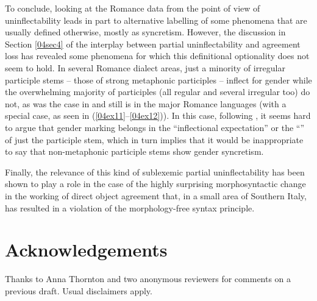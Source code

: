 \documentclass[output=paper,colorlinks,citecolor=brown]{langscibook}
\begin{document}
To conclude, looking at the Romance data from the point of view of uninflectability leads in part to alternative labelling of some phenomena that are usually defined otherwise, mostly as syncretism. However, the discussion in Section \ref{04sec4} of the interplay between partial uninflectability and agreement loss has revealed some phenomena for which this definitional optionality does not seem to hold. In several Romance dialect areas, just a minority of irregular participle stems -- those of strong metaphonic participles -- inflect for gender while the overwhelming majority of participles (all regular and several irregular too) do not, as was the case in  and still is in the major Romance languages (with  a special case, as seen in (\ref{04ex11}--\ref{04ex12})). In this case, following \citet[146]{spencer2020}, it seems hard to argue that gender marking belongs in the ``inflectional expectation'' or the ``'' of just the participle stem, which in turn implies that it would be inappropriate to say that non-metaphonic participle stems show gender syncretism.

Finally, the relevance of this kind of sublexemic partial uninflectability has been shown to play a role in the case of the highly surprising morphosyntactic change in the working of direct object agreement that, in a small area of Southern Italy, has resulted in a violation of the morphology-free syntax principle.
 
 

\section*{Acknowledgements}
Thanks to Anna Thornton and two anonymous reviewers for comments on a previous draft. Usual disclaimers apply.



{\sloppy\printbibliography[heading=subbibliography,notkeyword=this]}
\end{document}
